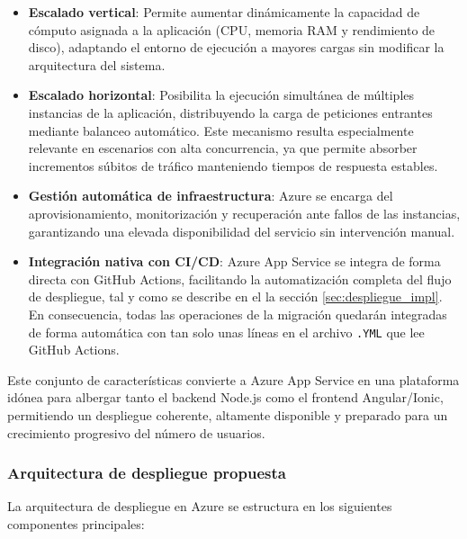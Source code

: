 \begin{itemize}
    \item \textbf{Escalado vertical}: Permite aumentar dinámicamente la capacidad de cómputo asignada a la aplicación (CPU, memoria RAM y rendimiento de disco), adaptando el entorno de ejecución a mayores cargas sin modificar la arquitectura del sistema.
    
    \item \textbf{Escalado horizontal}: Posibilita la ejecución simultánea de múltiples instancias de la aplicación, distribuyendo la carga de peticiones entrantes mediante balanceo automático. Este mecanismo resulta especialmente relevante en escenarios con alta concurrencia, ya que permite absorber incrementos súbitos de tráfico manteniendo tiempos de respuesta estables.
    
    \item \textbf{Gestión automática de infraestructura}: Azure se encarga del aprovisionamiento, monitorización y recuperación ante fallos de las instancias, garantizando una elevada disponibilidad del servicio sin intervención manual.
    
    \item \textbf{Integración nativa con CI/CD}: Azure App Service se integra de forma directa con GitHub Actions, facilitando la automatización completa del flujo de despliegue, tal y como se describe en el la sección \ref{sec:despliegue_impl}. En consecuencia, todas las operaciones de la migración quedarán integradas de forma automática con tan solo unas líneas en el archivo \texttt{.YML} que lee GitHub Actions.
\end{itemize}

Este conjunto de características convierte a Azure App Service en una plataforma idónea para albergar tanto el backend Node.js como el frontend Angular/Ionic, permitiendo un despliegue coherente, altamente disponible y preparado para un crecimiento progresivo del número de usuarios.

\subsubsection{Arquitectura de despliegue propuesta}

La arquitectura de despliegue en Azure se estructura en los siguientes componentes principales:

